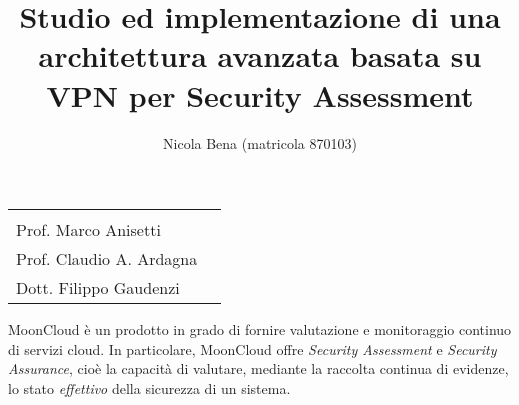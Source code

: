\documentclass[10pt,a4paper]{article}
\begin{document}
        \title{\textbf{Studio ed implementazione di una architettura avanzata
        basata su VPN per Security Assessment}}
        \author{Nicola Bena (matricola 870103)}
        \date{}

        \maketitle

        \vspace{0.5cm}

        \begin{minipage}{\linewidth}
            \begin{tabular}{l r}
                \begin{minipage}[t]{.4\linewidth}
                    \begin{flushleft}
                        {%
                            RELATORE\\[.15cm]
                            Prof. Marco Anisetti
                        }
                    \end{flushleft}
                \end{minipage}
                &
                \begin{minipage}[t]{.53\linewidth}
                    \begin{flushright}
                        {%
                            CORRELATORI\\[.15cm]
                            Prof. Claudio A. Ardagna\\[.1cm]
                            Dott. Filippo Gaudenzi
                        }
                    \end{flushright}
                \end{minipage}
            \end{tabular}
        \end{minipage}

        \vspace{2cm}

        MoonCloud è un prodotto in grado di fornire valutazione e monitoraggio continuo
        di servizi cloud. In particolare, MoonCloud offre \textit{Security Assessment} e
        \textit{Security Assurance}, cioè la capacità di valutare, mediante
        la raccolta continua di evidenze, lo stato \textit{effettivo} della sicurezza
        di un sistema.
\end{document}
